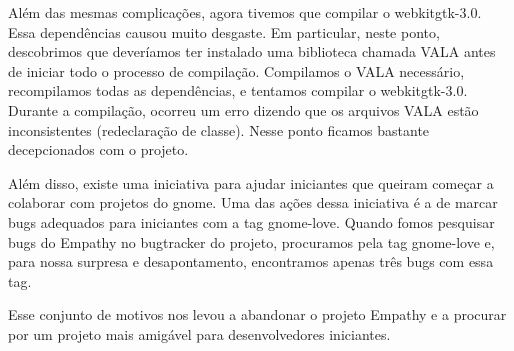 Além das mesmas complicações, agora tivemos que compilar o webkitgtk-3.0.
Essa dependências causou muito desgaste. Em particular, neste ponto, descobrimos
que deveríamos ter instalado uma biblioteca chamada VALA antes de iniciar todo o
processo de compilação.
Compilamos o VALA necessário, recompilamos todas as dependências, e tentamos
compilar o webkitgtk-3.0. Durante a compilação, ocorreu um erro dizendo que os
arquivos VALA estão inconsistentes (redeclaração de classe). Nesse ponto ficamos
bastante decepcionados com o projeto.

Além disso, existe uma iniciativa para ajudar iniciantes que queiram começar
a colaborar com projetos do gnome. Uma das ações dessa iniciativa é a de marcar
bugs adequados para iniciantes com a tag gnome-love. Quando fomos pesquisar bugs
do Empathy no bugtracker do projeto, procuramos pela tag gnome-love e, para
nossa surpresa e desapontamento, encontramos apenas três bugs com essa tag.

Esse conjunto de motivos nos levou a abandonar o projeto Empathy e a procurar
por um projeto mais amigável para desenvolvedores iniciantes.
